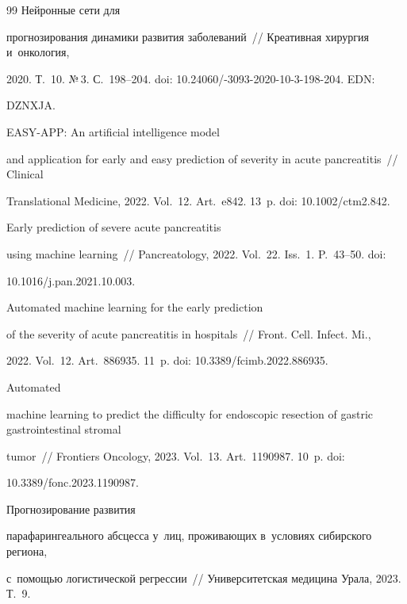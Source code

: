 {{\begin{thebibliography}{99}
 Нейронные сети для 

прогнозирования динамики развития заболеваний~/\!\!/ Креативная хирургия и~онкология, 

2020. Т.~10. №\,3. С.~198--204. doi: 10.24060\!/-3093-2020-10-3-198-204. EDN: 

DZNXJA.


 EASY-APP: An artificial intelligence model 

and application for early and easy prediction of severity in acute pancreatitis~/\!\!/ Clinical 

Translational Medicine, 2022. Vol.~12. Art.~e842. 13~p. doi: 10.1002\!/\!ctm2.842.


 Early prediction of severe acute pancreatitis 

using machine learning~/\!\!/ Pancreatology, 2022. Vol.~22. Iss.~1. P.~43--50. doi: 

10.1016\!/\!j.pan.2021.10.003.


 Automated machine learning for the early prediction 

of the severity of acute pancreatitis in hospitals~/\!\!/ Front. Cell. Infect. Mi., 

2022. Vol.~12. Art.~886935. 11~p. doi: 10.3389\!/\!fcimb.2022.886935.


 Automated 

machine learning to predict the difficulty for endoscopic resection of gastric gastrointestinal stromal 

tumor~/\!\!/ Frontiers Oncology, 2023. Vol.~13. Art.~1190987. 10~p. doi: 

10.3389\!/\!fonc.2023.1190987.


 Прогнозирование развития 

парафарингеального абсцесса у~лиц, проживающих в~условиях сибирского региона,  

с~по\-мощью логистической регрессии~/\!\!/ Университетская медицина Урала, 2023. Т.~9. 


\end{thebibliography}}}
